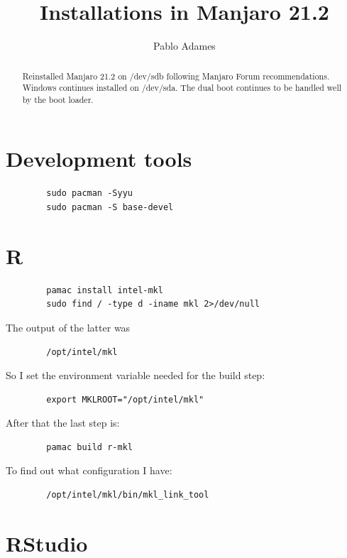 \documentclass[]{scrartcl}
\title{Installations in Manjaro 21.2}
\author{Pablo Adames}
\begin{document}
	
	\maketitle
	
	\begin{abstract}
		Reinstalled Manjaro 21.2 on /dev/sdb following Manjaro Forum recommendations.
		Windows continues installed on /dev/sda.
		The dual boot continues to be handled well by the boot loader.
	\end{abstract}
	
	\section{Development tools}
	
	\begin{verbatim}
		sudo pacman -Syyu
		sudo pacman -S base-devel
	\end{verbatim}
	
	\section{R}
	
	\begin{verbatim}
		pamac install intel-mkl
		sudo find / -type d -iname mkl 2>/dev/null
	\end{verbatim}
	
	The output of the latter was
	\begin{verbatim}
		/opt/intel/mkl
	\end{verbatim}
	
	So I set the environment variable needed for the build step:
	
	\begin{verbatim}
		export MKLROOT="/opt/intel/mkl"
	\end{verbatim}
	
	After that the last step is:
	
	\begin{verbatim}
		pamac build r-mkl
	\end{verbatim}
	
	To find out what configuration I have:
	\begin{verbatim}
		/opt/intel/mkl/bin/mkl_link_tool
	\end{verbatim} 
	
	
	\section{RStudio}
	
\end{document}
